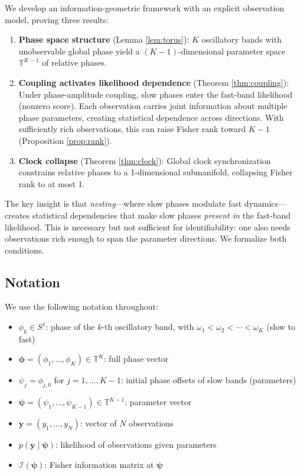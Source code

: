 \documentclass[12pt]{article}
\newcommand{\T}{\mathbb{T}}
\newcommand{\FIM}{\mathcal{I}}
\begin{document}
We develop an information-geometric framework with an explicit observation model, proving three results:

\begin{enumerate}
    \item \textbf{Phase space structure} (Lemma \ref{lem:torus}): $K$ oscillatory bands with unobservable global phase yield a $(K-1)$-dimensional parameter space $\T^{K-1}$ of relative phases.

    \item \textbf{Coupling activates likelihood dependence} (Theorem \ref{thm:coupling}): Under phase-amplitude coupling, slow phases enter the fast-band likelihood (nonzero score). Each observation carries joint information about multiple phase parameters, creating statistical dependence across directions. With sufficiently rich observations, this can raise Fisher rank toward $K-1$ (Proposition \ref{prop:rank}).

    \item \textbf{Clock collapse} (Theorem \ref{thm:clock}): Global clock synchronization constrains relative phases to a 1-dimensional submanifold, collapsing Fisher rank to at most 1.
\end{enumerate}

The key insight is that \emph{nesting}---where slow phases modulate fast dynamics---creates statistical dependencies that make slow phases \emph{present in} the fast-band likelihood. This is necessary but not sufficient for identifiability: one also needs observations rich enough to span the parameter directions. We formalize both conditions.

\subsection{Notation}

We use the following notation throughout:
\begin{itemize}
    \item $\phi_k \in S^1$: phase of the $k$-th oscillatory band, with $\omega_1 < \omega_2 < \cdots < \omega_K$ (slow to fast)
    \item $\bm{\phi} = (\phi_1, \ldots, \phi_K) \in \T^K$: full phase vector
    \item $\psi_j = \phi_{j,0}$ for $j = 1, \ldots, K-1$: initial phase offsets of slow bands (parameters)
    \item $\bm{\psi} = (\psi_1, \ldots, \psi_{K-1}) \in \T^{K-1}$: parameter vector
    \item $\bm{y} = (y_1, \ldots, y_N)$: vector of $N$ observations
    \item $p(\bm{y} \mid \bm{\psi})$: likelihood of observations given parameters
    \item $\FIM(\bm{\psi})$: Fisher information matrix at $\bm{\psi}$
\end{itemize}
\end{document}
